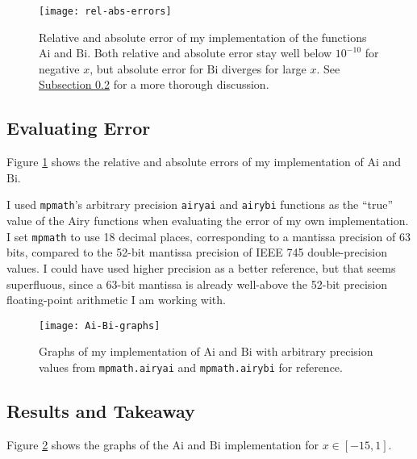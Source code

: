 \documentclass[11pt, a4paper]{article}
\newcommand{\Ai}{\mathrm{Ai}}
\newcommand{\Bi}{\mathrm{Bi}}
\begin{document}
\begin{figure} [htb!]
	\centering
	\texttt{[image: rel-abs-errors]}
	\vspace{-8mm}
	\caption{Relative and absolute error of my implementation of the functions $ \Ai $ and $ \Bi $. Both relative and absolute error stay well below $ 10^{-10} $ for negative $ x $, but absolute error for $ \Bi $ diverges for large $ x $. See \hyperref[airy:ss:results]{\underline{Subsection \ref{airy:ss:results}}} for a more thorough discussion.} 
	\label{airy:fig:rel-abs-errors}
\end{figure}



\subsection{Evaluating Error}
Figure \ref{airy:fig:rel-abs-errors} shows the relative and absolute errors of my implementation of $ \Ai $ and $ \Bi $. 

I used \texttt{mpmath}'s arbitrary precision \texttt{airyai} and \texttt{airybi} functions as the ``true'' value of the Airy functions when evaluating the error of my own implementation. I set \texttt{mpmath} to use 18 decimal places, corresponding to a mantissa precision of 63 bits, compared to the 52-bit mantissa precision of IEEE 745 double-precision values. I could have used higher precision as a better reference, but that seems superfluous, since a 63-bit mantissa is already well-above the 52-bit precision  floating-point arithmetic I am working with.

\begin{figure}
	\centering
	\texttt{[image: Ai-Bi-graphs]}
	\vspace{-8mm}
	\caption{Graphs of my implementation of $ \Ai $ and $ \Bi $ with arbitrary precision values from \texttt{mpmath.airyai} and \texttt{mpmath.airybi} for reference.} 
	\label{airy:fig:Ai-Bi-graphs}
\end{figure}

\subsection{Results and Takeaway} \label{airy:ss:results}
Figure \ref{airy:fig:Ai-Bi-graphs} shows the graphs of the $ \Ai $ and $ \Bi $ implementation for $ x \in [-15, 1] $. 
\end{document}
